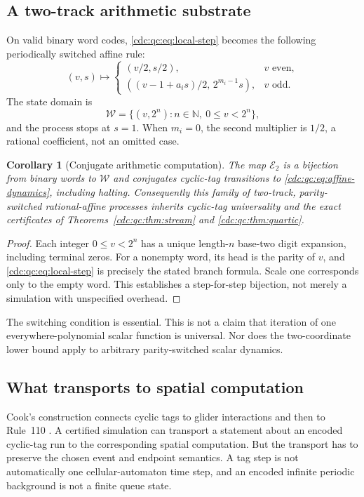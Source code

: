 \documentclass[11pt,a4paper]{article}
\newtheorem{corollary}[corollary]{Corollary}
\theoremstyle{definition}
\theoremstyle{remark}
\newcommand{\N}{\mathbb N}
\begin{document}
\subsection{A two-track arithmetic substrate}
On valid binary word codes, \eqref{cdc:qc:eq:local-step} becomes the following periodically switched affine rule:
\begin{equation}\label{cdc:qc:eq:affine-dynamics}
 (v,s)\longmapsto
 \begin{cases}
 (v/2,s/2),&v\text{ even},\\[2pt]
 ((v-1+a_i s)/2,\,2^{m_i-1}s),&v\text{ odd}.
 \end{cases}
\end{equation}
The state domain is
\[
 \mathcal W=\{(v,2^n):n\in\N,\ 0\leq v<2^n\},
\]
and the process stops at $s=1$. When $m_i=0$, the second multiplier is $1/2$, a rational coefficient, not an omitted case.

\begin{corollary}[Conjugate arithmetic computation]
The map $\mathcal E_2$ is a bijection from binary words to $\mathcal W$ and conjugates cyclic-tag transitions to \eqref{cdc:qc:eq:affine-dynamics}, including halting. Consequently this family of two-track, parity-switched rational-affine processes inherits cyclic-tag universality and the exact certificates of Theorems~\ref{cdc:qc:thm:stream} and \ref{cdc:qc:thm:quartic}.
\end{corollary}
\begin{proof}
Each integer $0\leq v<2^n$ has a unique length-$n$ base-two digit expansion, including terminal zeros. For a nonempty word, its head is the parity of $v$, and \eqref{cdc:qc:eq:local-step} is precisely the stated branch formula. Scale one corresponds only to the empty word. This establishes a step-for-step bijection, not merely a simulation with unspecified overhead.
\end{proof}
The switching condition is essential. This is not a claim that iteration of one everywhere-polynomial scalar function is universal. Nor does the two-coordinate lower bound apply to arbitrary parity-switched scalar dynamics.

\subsection{What transports to spatial computation}
Cook's construction connects cyclic tags to glider interactions and then to Rule~110 \cite{cook}. A certified simulation can transport a statement about an encoded cyclic-tag run to the corresponding spatial computation. But the transport has to preserve the chosen event and endpoint semantics. A tag step is not automatically one cellular-automaton time step, and an encoded infinite periodic background is not a finite queue state.
\end{document}
